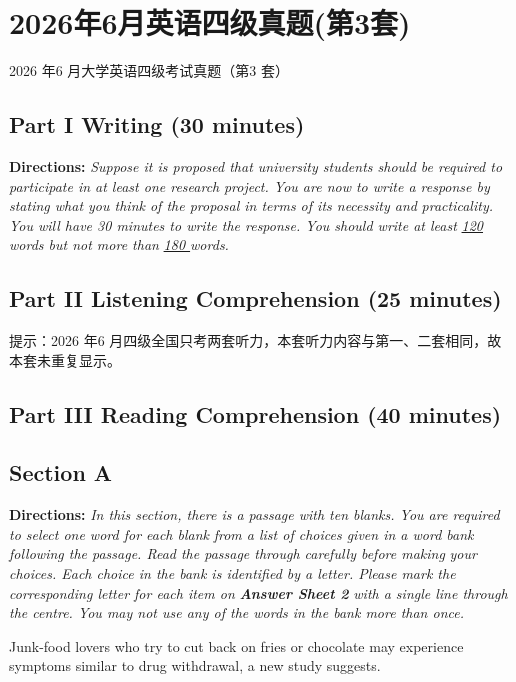 \documentclass[UTF8,11pt]{ctexart}
\begin{document}
\section*{2026年6月英语四级真题(第3套)}
2026 年6 月大学英语四级考试真题（第3 套）


\subsection*{\textbf{Part I Writing} \textbf{(30 minutes)}}


\textbf{Directions:} \textit{Suppose it is proposed that university students should be required to participate in at least one research} \textit{project. You are now to write a response by stating what you think of the proposal in terms of its necessity and} \textit{practicality. You will have 30 minutes to write the response. You should write at least }\textit{\uline{120 }}\textit{words but not more than} \textit{\uline{180 }}\textit{words.}


\subsection*{\textbf{Part II} \textbf{Listening Comprehension} \textbf{(25 minutes)}}


提示：2026 年6 月四级全国只考两套听力，本套听力内容与第一、二套相同，故本套未重复显示。


\subsection*{\textbf{Part III Reading Comprehension (40 minutes)}}


\subsection*{\textbf{Section A}}


\textbf{Directions:} \textit{In this section, there is a passage with ten blanks. You are required to select one word for each blank} \textit{from a list of choices given in a word bank following the passage. Read the passage through carefully before making} \textit{your choices. Each choice in the bank is identified by a letter. Please mark the corresponding letter for each item on} \textbf{\textit{Answer Sheet 2}}\textit{ with a single line through the centre. You may not use any of the words in the bank more than once.}


Junk-food lovers who try to cut back on fries or chocolate may experience symptoms similar to drug withdrawal, a new study suggests.
\end{document}
